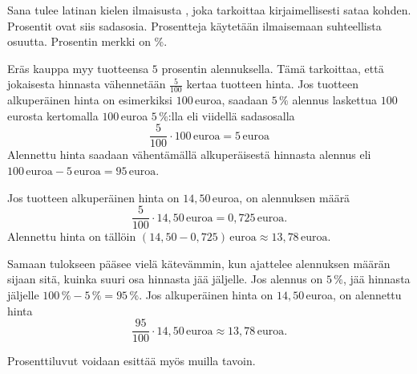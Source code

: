 Sana  tulee latinan kielen ilmaisusta , joka tarkoittaa kirjaimellisesti sataa kohden. Prosentit ovat siis sadasosia. Prosentteja käytetään ilmaisemaan suhteellista osuutta. Prosentin merkki on \%.


\begin{esimerkki}

\begin{esimratk}
\end{esimratk}
\end{esimerkki}


\begin{esimerkki}
Eräs kauppa myy tuotteensa $5$ prosentin alennuksella. Tämä tarkoittaa, että jokaisesta hinnasta vähennetään $\frac{5}{100}$ kertaa tuotteen hinta. Jos tuotteen alkuperäinen hinta on esimerkiksi $100$\,euroa, saadaan $5\,\%$ alennus laskettua $100$\,eurosta kertomalla $100$\,euroa $5\,\%$:lla eli viidellä sadasosalla 
\[
\frac{5}{100} \cdot 100\,\text{euroa} = 5\,\text{euroa}
\]
Alennettu hinta saadaan vähentämällä alkuperäisestä hinnasta alennus eli $100\,\text{euroa} - 5\,\text{euroa} = 95\,\text{euroa}$.

Jos tuotteen alkuperäinen hinta on $14,50$\,euroa, on alennuksen määrä
\[
	\frac{5}{100} \cdot 14,50\,\text{euroa} = 0,725\,\text{euroa}.
\]
Alennettu hinta on tällöin $(14,50 - 0,725)\,\text{euroa} \approx 13,78\,\text{euroa}$.

Samaan tulokseen pääsee vielä kätevämmin, kun ajattelee alennuksen määrän sijaan sitä, kuinka suuri osa hinnasta jää jäljelle. Jos alennus on $5\,\%$, jää hinnasta jäljelle $100\,\% - 5\,\% = 95\,\%$. Jos alkuperäinen hinta on $14,50$\,euroa, on alennettu hinta 
\[
	\frac{95}{100} \cdot 14,50\,\text{euroa} \approx 13,78\,\text{euroa}.
\]
\end{esimerkki}

\begin{esimerkki}
    Prosenttiluvut voidaan esittää myös muilla tavoin.
\end{esimerkki}

